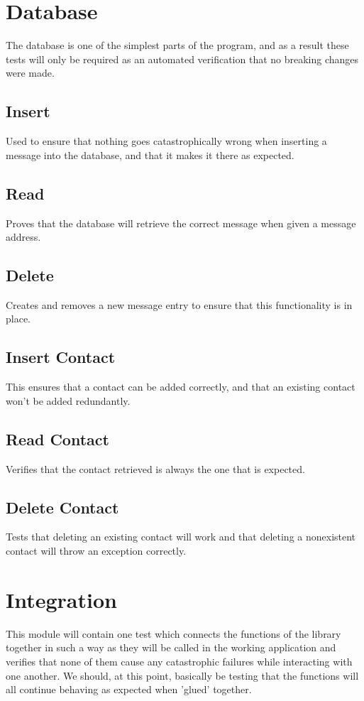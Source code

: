 \documentclass[titlepage]{report}
\begin{document}
\section{Database}
The database is one of the simplest parts of the program, and as a result these tests will only be required as an automated verification that no breaking changes were made.
\subsection{Insert}
Used to ensure that nothing goes catastrophically wrong when inserting a message into the database, and that it makes it there as expected.
\subsection{Read}
Proves that the database will retrieve the correct message when given a message address.
\subsection{Delete}
Creates and removes a new message entry to ensure that this functionality is in place.
\subsection{Insert Contact}
This ensures that a contact can be added correctly, and that an existing contact won't be added redundantly.
\subsection{Read Contact}
Verifies that the contact retrieved is always the one that is expected.
\subsection{Delete Contact}
Tests that deleting an existing contact will work and that deleting a nonexistent contact will throw an exception correctly.

\section{Integration}
This module will contain one test which connects the functions of the library together in such a way as they will be called in the working application and verifies that none of them cause any catastrophic failures while interacting with one another. We should, at this point, basically be testing that the functions will all continue behaving as expected when 'glued' together.
\end{document}
